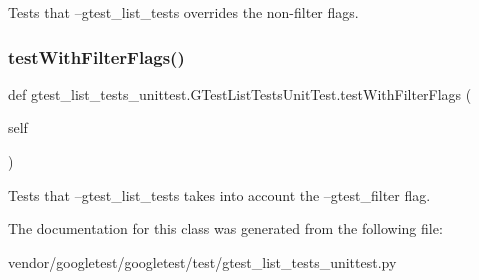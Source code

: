 \begin{DoxyVerb}Tests that --gtest_list_tests overrides the non-filter flags.\end{DoxyVerb}
 \mbox{\label{classgtest__list__tests__unittest_1_1_g_test_list_tests_unit_test_ac5bef6c9fb78b8eef84427de811fd70f}} 
\subsubsection{\texorpdfstring{test\+With\+Filter\+Flags()}{testWithFilterFlags()}}
{\footnotesize\ttfamily def gtest\+\_\+list\+\_\+tests\+\_\+unittest.\+G\+Test\+List\+Tests\+Unit\+Test.\+test\+With\+Filter\+Flags (\begin{DoxyParamCaption}\item[{}]{self }\end{DoxyParamCaption})}

\begin{DoxyVerb}Tests that --gtest_list_tests takes into account the
--gtest_filter flag.\end{DoxyVerb}
 

The documentation for this class was generated from the following file\+:\begin{DoxyCompactItemize}
\item 
vendor/googletest/googletest/test/gtest\+\_\+list\+\_\+tests\+\_\+unittest.\+py\end{DoxyCompactItemize}
